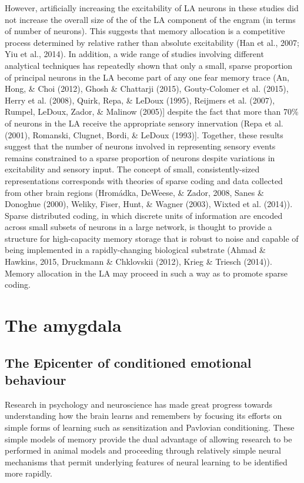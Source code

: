 \documentclass[12pt,a4paperpaper,]{report}
\begin{document}
However, artificially increasing the excitability of LA neurons in these
studies did not increase the overall size of the of the LA component of
the engram (in terms of number of neurons). This suggests that memory
allocation is a competitive process determined by relative rather than
absolute excitability (Han et al., 2007; Yiu et al., 2014). In addition,
a wide range of studies involving different analytical techniques has
repeatedly shown that only a small, sparse proportion of principal
neurons in the LA become part of any one fear memory trace (An, Hong, \&
Choi (2012), Ghosh \& Chattarji (2015), Gouty-Colomer et al. (2015),
Herry et al. (2008), Quirk, Repa, \& LeDoux (1995), Reijmers et al.
(2007), Rumpel, LeDoux, Zador, \& Malinow (2005){]} despite the fact
that more than 70\% of neurons in the LA receive the appropriate sensory
innervation (Repa et al. (2001), Romanski, Clugnet, Bordi, \& LeDoux
(1993){]}. Together, these results suggest that the number of neurons
involved in representing sensory events remains constrained to a sparse
proportion of neurons despite variations in excitability and sensory
input. The concept of small, consistently-sized representations
corresponds with theories of sparse coding and data collected from other
brain regions (Hromádka, DeWeese, \& Zador, 2008, Sanes \& Donoghue
(2000), Weliky, Fiser, Hunt, \& Wagner (2003), Wixted et al. (2014)).
Sparse distributed coding, in which discrete units of information are
encoded across small subsets of neurons in a large network, is thought
to provide a structure for high-capacity memory storage that is robust
to noise and capable of being implemented in a rapidly-changing
biological substrate (Ahmad \& Hawkins, 2015, Druckmann \& Chklovskii
(2012), Krieg \& Triesch (2014)). Memory allocation in the LA may
proceed in such a way as to promote sparse coding.

\section{The amygdala}\label{the-amygdala}

\subsection{The Epicenter of conditioned emotional
behaviour}\label{the-epicenter-of-conditioned-emotional-behaviour}

Research in psychology and neuroscience has made great progress towards
understanding how the brain learns and remembers by focusing its efforts
on simple forms of learning such as sensitization and Pavlovian
conditioning. These simple models of memory provide the dual advantage
of allowing research to be performed in animal models and proceeding
through relatively simple neural mechanisms that permit underlying
features of neural learning to be identified more rapidly.
\end{document}
